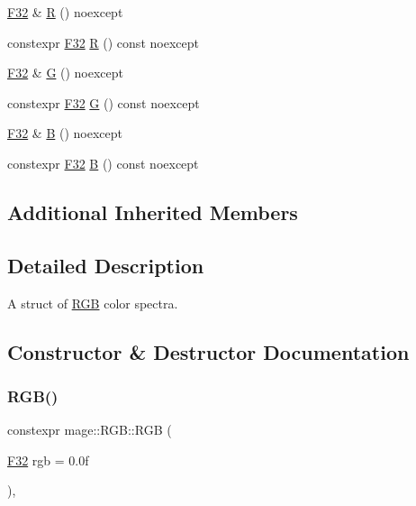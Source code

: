 \begin{DoxyCompactItemize}
\mbox{\hyperlink{namespacemage_aa97e833b45f06d60a0a9c4fc22ae02c0}{F32}} \& \mbox{\hyperlink{structmage_1_1_r_g_b_a0125eee4ebad06ecfc54be1ffe601eb4}{R}} () noexcept
\item 
constexpr \mbox{\hyperlink{namespacemage_aa97e833b45f06d60a0a9c4fc22ae02c0}{F32}} \mbox{\hyperlink{structmage_1_1_r_g_b_ad0a4d0192ecc2a85ba046b62818a8623}{R}} () const noexcept
\item 
\mbox{\hyperlink{namespacemage_aa97e833b45f06d60a0a9c4fc22ae02c0}{F32}} \& \mbox{\hyperlink{structmage_1_1_r_g_b_aedeed66436cdee0e7a9f19e650d3a44b}{G}} () noexcept
\item 
constexpr \mbox{\hyperlink{namespacemage_aa97e833b45f06d60a0a9c4fc22ae02c0}{F32}} \mbox{\hyperlink{structmage_1_1_r_g_b_a3cff21300a4b2f44692b39d09930af39}{G}} () const noexcept
\item 
\mbox{\hyperlink{namespacemage_aa97e833b45f06d60a0a9c4fc22ae02c0}{F32}} \& \mbox{\hyperlink{structmage_1_1_r_g_b_a8c3aa800eeb679f42d33e0a029081db3}{B}} () noexcept
\item 
constexpr \mbox{\hyperlink{namespacemage_aa97e833b45f06d60a0a9c4fc22ae02c0}{F32}} \mbox{\hyperlink{structmage_1_1_r_g_b_a3f90c799411cc78913e4c0e403c16c7a}{B}} () const noexcept
\end{DoxyCompactItemize}
\subsection*{Additional Inherited Members}


\subsection{Detailed Description}
A struct of \mbox{\hyperlink{structmage_1_1_r_g_b}{R\+GB}} color spectra. 

\subsection{Constructor \& Destructor Documentation}
\mbox{\label{structmage_1_1_r_g_b_a166d2c13b46f9518c132c68f1117e5c6}} 
\subsubsection{\texorpdfstring{R\+G\+B()}{RGB()}\hspace{0.1cm}{\footnotesize\ttfamily [1/7]}}
{\footnotesize\ttfamily constexpr mage\+::\+R\+G\+B\+::\+R\+GB (\begin{DoxyParamCaption}\item[{\mbox{\hyperlink{namespacemage_aa97e833b45f06d60a0a9c4fc22ae02c0}{F32}}}]{rgb = {\ttfamily 0.0f} }\end{DoxyParamCaption})\hspace{0.3cm}{\ttfamily [explicit]}, {\ttfamily [noexcept]}}

